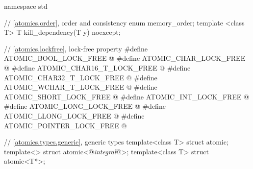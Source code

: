 %
\begin{codeblock}
namespace std {
  // \ref{atomics.order}, order and consistency
  enum memory_order;
  template <class T>
    T kill_dependency(T y) noexcept;

  // \ref{atomics.lockfree}, lock-free property
  #define ATOMIC_BOOL_LOCK_FREE @\unspec@
  #define ATOMIC_CHAR_LOCK_FREE @\unspec@
  #define ATOMIC_CHAR16_T_LOCK_FREE @\unspec@
  #define ATOMIC_CHAR32_T_LOCK_FREE @\unspec@
  #define ATOMIC_WCHAR_T_LOCK_FREE @\unspec@
  #define ATOMIC_SHORT_LOCK_FREE @\unspec@
  #define ATOMIC_INT_LOCK_FREE @\unspec@
  #define ATOMIC_LONG_LOCK_FREE @\unspec@
  #define ATOMIC_LLONG_LOCK_FREE @\unspec@
  #define ATOMIC_POINTER_LOCK_FREE @\unspec@

  // \ref{atomics.types.generic}, generic types
  template<class T> struct atomic;
  template<> struct atomic<@\textit{integral}@>;
  template<class T> struct atomic<T*>;

}
\end{codeblock}

